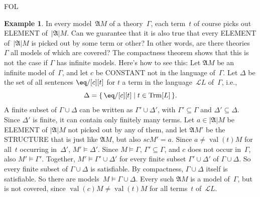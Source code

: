 \documentclass[10pt,a4paper]{article}
\newcommand*{\olup}[1]{\MakeUppercase{#1}}
\theoremstyle{plain}
\theoremstyle{definition}
\newtheorem{ex}[thm]{Example}
\theoremstyle{remark}
\providecommand{\Struct}{\ensuremath{\mathfrak{A}}}
\providecommand{\Domain}{\ensuremath{|\mathfrak{A}|}}
\providecommand{\Assign}{\ensuremath{s}}
\providecommand{\Sat}[2]{\ensuremath{#1 \models #2}}
\providecommand{\Lang}{\ensuremath{\mathcal{L}}}
\providecommand{\iftag}[1]{#1}
\providecommand{\Setabs}[2]{\{\, #1 \mid #2 \,\}}
\providecommand{\Value}[1]{\operatorname{val}(#1)}
\providecommand{\Trm}{\mathrm{Trm}}
\providecommand{\iftag}{}
\begin{document}
\iftag{FOL}{%
\begin{ex}
In every model~$\Struct{M}$ of a theory~$\Gamma$, each term~$t$ of
course picks out \olup{element} of~$\Domain{M}$. Can we guarantee that
it is also true that every \olup{element} of~$\Domain{M}$ is picked out
by some term or other? In other words, are there theories~$\Gamma$ all
models of which are covered?  The compactness theorem shows that this
is not the case if $\Gamma$ has infinite models. Here's how to see
this: Let $\Struct{M}$ be an infinite model of~$\Gamma$, and let $c$
be \olup{constant} not in the language of~$\Gamma$. Let $\Delta$ be the
set of all sentences $\eq/[c][t]$ for $t$ a term in the
language~$\Lang{L}$ of~$\Gamma$, i.e.,
  \[
  \Delta = \Setabs{\eq/[c][t]}{t \in \Trm[L]}.
  \]
A finite subset of $\Gamma \cup \Delta$ can be written as $\Gamma'
\cup \Delta'$, with $\Gamma' \subseteq \Gamma$ and $\Delta' \subseteq
\Delta$. Since $\Delta'$ is finite, it can contain only finitely many
terms. Let $a \in \Domain{M}$ be \olup{element} of $\Domain{M}$ not
picked out by any of them, and let $\Struct{M'}$ be the \olup{structure}
that is just like $\Struct{M}$, but also $\Assign{c}{M'} = a$. Since
$a \neq \Value{t}{M}$ for all~$t$ occurring in~$\Delta'$,
$\Sat{M'}{\Delta'}$. Since $\Sat{M}{\Gamma}$, $\Gamma' \subseteq
\Gamma$, and $c$ does not occur in~$\Gamma$, also
$\Sat{M'}{\Gamma'}$. Together, $\Sat{M'}{\Gamma' \cup \Delta'}$ for
every finite subset $\Gamma' \cup \Delta'$ of $\Gamma \cup \Delta$. So
every finite subset of $\Gamma \cup \Delta$ is satisfiable. By
compactness, $\Gamma \cup \Delta$ itself is satisfiable. So there are
models~$\Sat{M}{\Gamma \cup \Delta}$. Every such $\Struct{M}$ is a
model of~$\Gamma$, but is not covered, since $\Value{c}{M} \neq
\Value{t}{M}$ for all terms~$t$ of~$\Lang{L}$.
\end{ex}

}
\end{document}
